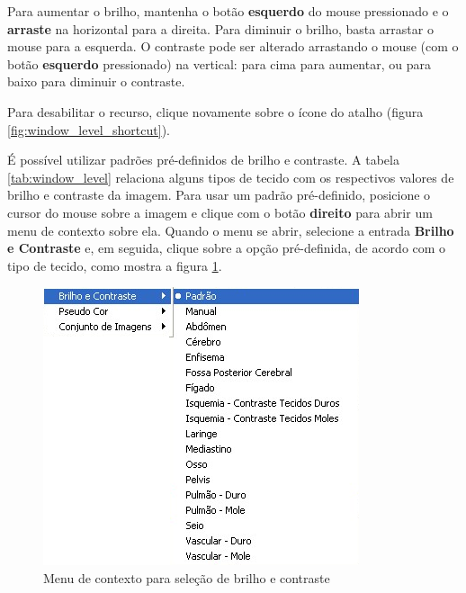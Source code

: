 Para aumentar o brilho, mantenha o botão \textbf{esquerdo} do mouse pressionado e o \textbf{arraste} na 
horizontal para a direita. Para diminuir o brilho, basta arrastar o mouse para a esquerda. O contraste
pode ser alterado arrastando o mouse (com o botão \textbf{esquerdo} pressionado) na vertical: para cima
para aumentar, ou para baixo para diminuir o contraste.

Para desabilitar o recurso, clique novamente sobre o ícone do atalho (figura \ref{fig:window_level_shortcut}).

É possível utilizar padrões pré-definidos de brilho e contraste. A tabela \ref{tab:window_level} relaciona
alguns tipos de tecido com os respectivos valores de brilho e contraste da imagem. Para usar um padrão
pré-definido, posicione o cursor do mouse sobre a imagem e clique com o botão \textbf{direito} para abrir um
menu de contexto sobre ela. Quando o menu se abrir, selecione a entrada \textbf{Brilho e Contraste} e, em
seguida, clique sobre a opção pré-definida, de acordo com o tipo de tecido, como mostra a figura
\ref{fig:window_level}.


\begin{figure}[!htb]
\centering
\includegraphics[scale=0.40]{../user_guide_figures/invesalius_screen/menu_window_and_level_pt.png}
\caption{Menu de contexto para seleção de brilho e contraste}
\label{fig:window_level}
\end{figure}

